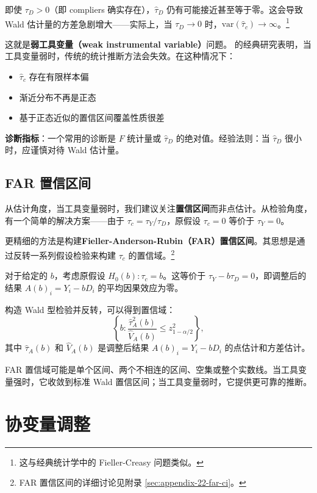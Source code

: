 即使 $\tau_D > 0$（即 compliers 确实存在），$\hat{\tau}_D$ 仍有可能接近甚至等于零。这会导致 Wald 估计量的方差急剧增大——实际上，当 $\tau_D \to 0$ 时，$\text{var}(\hat{\tau}_c) \to \infty$。\footnote{这与经典统计学中的 Fieller-Creasy 问题类似。}

这就是\textbf{弱工具变量（weak instrumental variable）}问题。\citet{StaigerStock:1997} 的经典研究表明，当工具变量弱时，传统的统计推断方法会失效。在这种情况下：
\begin{itemize}
  \item $\hat{\tau}_c$ 存在有限样本偏
  \item 渐近分布不再是正态
  \item 基于正态近似的置信区间覆盖性质很差
\end{itemize}

\textbf{诊断指标}：一个常用的诊断是 $F$ 统计量或 $\hat{\tau}_D$ 的绝对值。经验法则：当 $\hat{\tau}_D$ 很小时，应谨慎对待 Wald 估计量。

\subsection{FAR 置信区间}\label{sec:22-far-ci}

从估计角度，当工具变量弱时，我们建议关注\textbf{置信区间}而非点估计。从检验角度，有一个简单的解决方案——由于 $\tau_c = \tau_Y / \tau_D$，原假设 $\tau_c = 0$ 等价于 $\tau_Y = 0$。

更精细的方法是构建\textbf{Fieller-Anderson-Rubin（FAR）置信区间}。其思想是通过反转一系列假设检验来构建 $\tau_c$ 的置信域。\footnote{FAR 置信区间的详细讨论见附录 \cref{sec:appendix-22-far-ci}。}

对于给定的 $b$，考虑原假设 $H_0(b): \tau_c = b$。这等价于 $\tau_Y - b\tau_D = 0$，即调整后的结果 $A(b)_i = Y_i - b D_i$ 的平均因果效应为零。

构造 Wald 型检验并反转，可以得到置信域：
\[
\left\{ b: \frac{\hat{\tau}_A^2(b)}{\hat{V}_A(b)} \leq z_{1-\alpha/2}^2 \right\},
\label{eq:22-far-set}
\]
其中 $\hat{\tau}_A(b)$ 和 $\hat{V}_A(b)$ 是调整后结果 $A(b)_i = Y_i - b D_i$ 的点估计和方差估计。

FAR 置信域可能是单个区间、两个不相连的区间、空集或整个实数线。当工具变量强时，它收敛到标准 Wald 置信区间；当工具变量弱时，它提供更可靠的推断。

\section{协变量调整}\label{sec:22-covariates}

